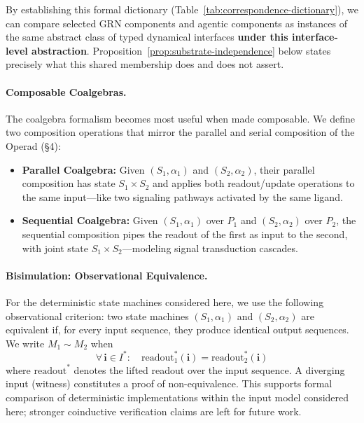 By establishing this formal dictionary (Table~\ref{tab:correspondence-dictionary}), we can compare selected GRN components and agentic
components as instances of the same abstract class of typed dynamical interfaces \textbf{under this
interface-level abstraction}. Proposition~\ref{prop:substrate-independence} below states precisely what this
shared membership does and does not assert.

\paragraph{Composable Coalgebras.}
The coalgebra formalism becomes most useful when made composable. We define two composition operations that mirror the parallel and serial composition of the Operad (\S4):
\begin{itemize}[leftmargin=*]
\item \textbf{Parallel Coalgebra:} Given $(S_1, \alpha_1)$ and $(S_2, \alpha_2)$, their parallel composition has state $S_1 \times S_2$ and applies both readout/update operations to the same input---like two signaling pathways activated by the same ligand.
\item \textbf{Sequential Coalgebra:} Given $(S_1, \alpha_1)$ over $P_1$ and $(S_2, \alpha_2)$ over $P_2$, the sequential composition pipes the readout of the first as input to the second, with joint state $S_1 \times S_2$---modeling signal transduction cascades.
\end{itemize}

\paragraph{Bisimulation: Observational Equivalence.}
For the deterministic state machines considered here, we use the following observational criterion:
two state machines $(S_1, \alpha_1)$ and $(S_2, \alpha_2)$ are equivalent if, for every input sequence,
they produce identical output sequences. We write $M_1 \sim M_2$ when
\begin{equation}
\forall \, \mathbf{i} \in I^*: \quad \mathrm{readout}_1^*(\mathbf{i}) = \mathrm{readout}_2^*(\mathbf{i})
\label{eq:bisimulation}
\end{equation}
where $\mathrm{readout}^*$ denotes the lifted readout over the input sequence. A diverging input (witness) constitutes a proof of non-equivalence. This supports formal comparison of deterministic implementations within the input model considered here; stronger coinductive verification claims are left for future work.

